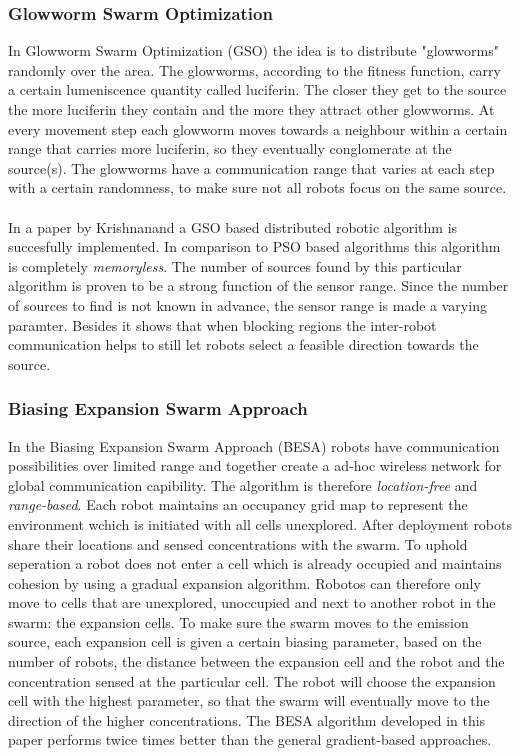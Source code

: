 	\subsubsection{Glowworm Swarm Optimization}
		In Glowworm Swarm Optimization (GSO) the idea is to distribute "glowworms" randomly over the area.
		The glowworms, according to the fitness function, carry a certain lumeniscence quantity called luciferin. 
		The closer they get to the source the more luciferin they contain and the more they attract other glowworms. 
		At every movement step each glowworm moves towards a neighbour within a certain range that carries more luciferin, so they eventually conglomerate at the source(s). 
		The glowworms have a communication range that varies at each step with a certain randomness, to make sure not all robots focus on the same source. \cite{krishnanand2005detection}\\
		\\
		In a paper by Krishnanand a GSO based distributed robotic algorithm is succesfully implemented. \cite{krishnanand2005detection}
		In comparison to PSO based algorithms this algorithm is completely \emph{memoryless}.
		The number of sources found by this particular algorithm is proven to be a strong function of the sensor range.
		Since the number of sources to find is not known in advance, the sensor range is made a varying paramter.
		Besides it shows that when blocking regions the inter-robot communication helps to still let robots select a feasible direction towards the source.

	\subsubsection{Biasing Expansion Swarm Approach}
		In the Biasing Expansion Swarm Approach (BESA) robots have communication possibilities over limited range and together create a ad-hoc wireless network for global communication capibility.
		The algorithm is therefore \emph{location-free} and \emph{range-based}.
		Each robot maintains an occupancy grid map to represent the environment wchich is initiated with all cells unexplored.
		After deployment robots share their locations and sensed concentrations with the swarm.
		To uphold seperation a robot does not enter a cell which is already occupied and maintains cohesion by using a gradual expansion algorithm.
		Robotos can therefore only move to cells that are unexplored, unoccupied and next to another robot in the swarm: the expansion cells.
		To make sure the swarm moves to the emission source, each expansion cell is given a certain biasing parameter, based on the number of robots, the distance between the expansion cell and the robot and the concentration sensed at the particular cell.
		The robot will choose the expansion cell with the highest parameter, so that the swarm will eventually move to the direction of the higher concentrations.
		The BESA algorithm developed in this paper performs twice times better than the general gradient-based approaches. \cite{cui2004swarm}

